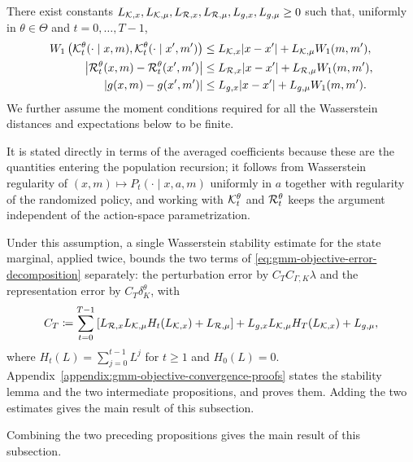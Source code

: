 \begin{assumption}
    \label{ass:gmm-objective-stability}
    There exist constants $L_{{\cal K},x}, L_{{\cal K},\mu}, L_{{\cal R},x}, L_{{\cal R},\mu}, L_{g,x}, L_{g,\mu} \geq 0$ such that, uniformly in $\theta\in\Theta$ and $t=0,\ldots,T-1$,
    \begin{align}
        W_1\left({\cal K}_t^\theta(\cdot\mid x,m), {\cal K}_t^\theta(\cdot\mid x',m') \right) &\leq L_{{\cal K},x}|x-x'| + L_{{\cal K},\mu}W_1(m,m'), \label{eq:gmm-kernel-lipschitz}\\
        \left| {\cal R}_t^\theta(x,m) - {\cal R}_t^\theta(x',m') \right| &\leq L_{{\cal R},x}|x-x'| + L_{{\cal R},\mu}W_1(m,m'), \label{eq:gmm-reward-lipschitz}\\
        \left| g(x,m) - g(x',m') \right| &\leq L_{g,x}|x-x'| + L_{g,\mu}W_1(m,m'). \label{eq:gmm-terminal-lipschitz}
    \end{align}
    We further assume the moment conditions required for all the Wasserstein distances and expectations below to be finite.
\end{assumption}

It is stated directly in terms of the averaged coefficients because these are the quantities entering the population recursion; it follows from Wasserstein regularity of $(x,m)\mapsto P_t(\cdot\mid x,a,m)$ uniformly in $a$ together with regularity of the randomized policy, and working with ${\cal K}_t^\theta$ and ${\cal R}_t^\theta$ keeps the argument independent of the action-space parametrization.

Under this assumption, a single Wasserstein stability estimate for the state marginal, applied twice, bounds the two terms of \eqref{eq:gmm-objective-error-decomposition} separately: the perturbation error by $C_TC_{\Gamma,K}\lambda$ and the representation error by $C_T\delta_K^\theta$, with
\begin{align}
    C_T \coloneqq \sum_{t=0}^{T-1} \left[ L_{{\cal R},x} L_{{\cal K},\mu} H_t(L_{{\cal K},x}) + L_{{\cal R},\mu} \right] + L_{g,x} L_{{\cal K},\mu} H_T(L_{{\cal K},x}) + L_{g,\mu},
    \label{eq:gmm-objective-stability-constant}
\end{align}
where $H_t(L)=\sum_{j=0}^{t-1}L^j$ for $t\geq1$ and $H_0(L)=0$. Appendix~\ref{appendix:gmm-objective-convergence-proofs} states the stability lemma and the two intermediate propositions, and proves them. Adding the two estimates gives the main result of this subsection.

Combining the two preceding propositions gives the main result of this subsection.

